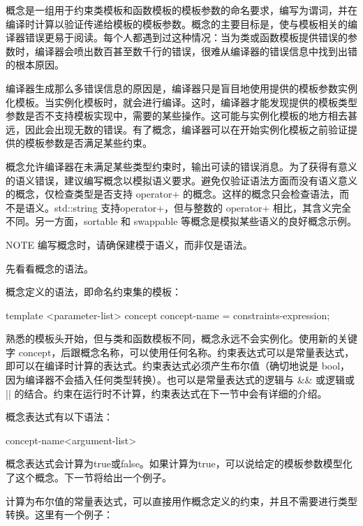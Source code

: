 
概念是一组用于约束类模板和函数模板的模板参数的命名要求，编写为谓词，并在编译时计算以验证传递给模板的模板参数。概念的主要目标是，使与模板相关的编译器错误更易于阅读。每个人都遇到过这种情况：当为类或函数模板提供错误的参数时，编译器会喷出数百甚至数千行的错误，很难从编译器的错误信息中找到出错的根本原因。

编译器生成那么多错误信息的原因是，编译器只是盲目地使用提供的模板参数实例化模板。当实例化模板时，就会进行编译。这时，编译器才能发现提供的模板类型参数是否不支持模板实现中，需要的某些操作。这可能与实例化模板的地方相去甚远，因此会出现无数的错误。有了概念，编译器可以在开始实例化模板之前验证提供的模板参数是否满足某些约束。

概念允许编译器在未满足某些类型约束时，输出可读的错误消息。为了获得有意义的语义错误，建议编写概念以模拟语义要求。避免仅验证语法方面而没有语义意义的概念，仅检查类型是否支持 operator+ 的概念。这样的概念只会检查语法，而不是语义。std::string 支持operator+，但与整数的 operator+ 相比，其含义完全不同。另一方面，sortable 和 swappable 等概念是模拟某些语义的良好概念示例。

\begin{myNotic}{NOTE}
编写概念时，请确保建模于语义，而非仅是语法。
\end{myNotic}

先看看概念的语法。


概念定义的语法，即命名约束集的模板：

\begin{cpp}
template <parameter-list>
concept concept-name = constraints-expression;
\end{cpp}

熟悉的模板头开始，但与类和函数模板不同，概念永远不会实例化。使用新的关键字 concept，后跟概念名称，可以使用任何名称。约束表达式可以是常量表达式，即可以在编译时计算的表达式。约束表达式必须产生布尔值（确切地说是 bool，因为编译器不会插入任何类型转换）。也可以是常量表达式的逻辑与 \&\& 或逻辑或 || 的结合。约束在运行时不计算，约束表达式在下一节中会有详细的介绍。

概念表达式有以下语法：

\begin{cpp}
concept-name<argument-list>
\end{cpp}

概念表达式会计算为true或false。如果计算为true，可以说给定的模板参数模型化了这个概念。下一节将给出一个例子。


计算为布尔值的常量表达式，可以直接用作概念定义的约束，并且不需要进行类型转换。这里有一个例子：

